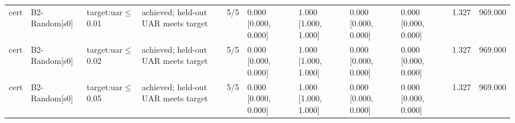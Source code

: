 \begin{table}[!ht]
{\begin{tabular}{lllllllllll}
cert & B2-Random[s0] & target:uar$\le$0.01 & achieved; held-out UAR meets target & 5/5 & 0.000 [0.000, 0.000] & 1.000 [1.000, 1.000] & 0.000 [0.000, 0.000] & 0.000 [0.000, 0.000] & 1.327 & 969.000 \\
cert & B2-Random[s0] & target:uar$\le$0.02 & achieved; held-out UAR meets target & 5/5 & 0.000 [0.000, 0.000] & 1.000 [1.000, 1.000] & 0.000 [0.000, 0.000] & 0.000 [0.000, 0.000] & 1.327 & 969.000 \\
cert & B2-Random[s0] & target:uar$\le$0.05 & achieved; held-out UAR meets target & 5/5 & 0.000 [0.000, 0.000] & 1.000 [1.000, 1.000] & 0.000 [0.000, 0.000] & 0.000 [0.000, 0.000] & 1.327 & 969.000 \\
\bottomrule
\end{tabular}}
\end{table}
